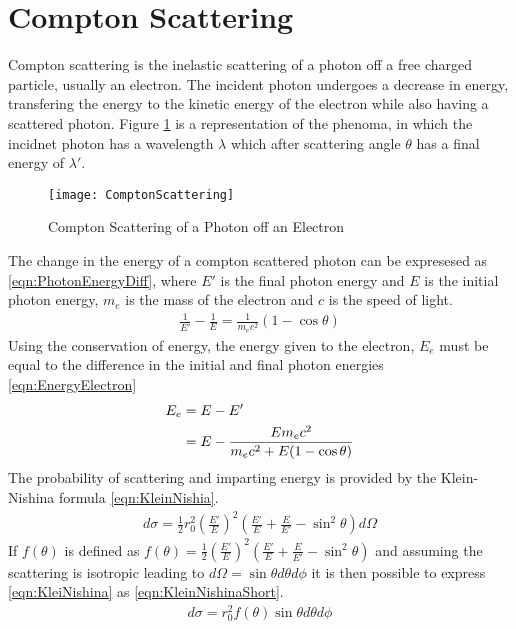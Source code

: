 \section{Compton Scattering}
Compton scattering is the inelastic scattering of a photon off a free charged particle, usually an electron.
The incident photon undergoes a decrease in energy, transfering the energy to the kinetic energy of the electron while also having a scattered photon.
Figure \ref{fig:ComptonScattering} is a representation of the phenoma, in which the incidnet photon has a wavelength $\lambda$ which after scattering angle $\theta$ has a final energy of $\lambda'$.
\begin{figure}
  \centering
  \texttt{[image: ComptonScattering]}
  \caption{Compton Scattering of a Photon off an Electron}
  \label{fig:ComptonScattering}
\end{figure}
The change in the energy of a compton scattered photon can be expresesed as \eqref{eqn:PhotonEnergyDiff}, where $E'$ is the final photon energy and $E$ is the initial photon energy, $m_e$ is the mass of the electron and $c$ is the speed of light.
\begin{align}
  \label{eqn:FinalPhotonEnergy}
  \frac{1}{E'} -\frac{1}{E} = \frac{1}{m_e c^2}\left(1-\cos\theta\right) 
\end{align}
Using the conservation of energy, the energy given to the electron, $E_e$ must be equal to the difference in the initial and final photon energies \eqref{eqn:EnergyElectron}
\begin{align}
  \label{eqn:EnergyElectron}
  E_e &= E - E' \\ \notag
   &= E - \frac{E m_e c^2}{m_e c^2 + E (1-\cos\theta)}
\end{align}
The probability of scattering and imparting energy is provided by the Klein-Nishina formula \eqref{eqn:KleinNishia}.
\begin{align}
  \label{eqn:KleinNishina}
  d\sigma = \frac{1}{2} r_0^2 \left(\frac{E'}{E}\right)^2 \left(\frac{E'}{E} + \frac{E}{E'}-\sin^2\theta\right)d\Omega
\end{align}
If $f(\theta)$ is defined as $f(\theta) = \frac{1}{2}\left(\frac{E'}{E}\right)^2 \left(\frac{E'}{E} + \frac{E}{E'}-\sin^2\theta\right)$ and assuming the scattering is isotropic leading to $d\Omega = \sin\theta d\theta d\phi$ it is then possible to express \eqref{eqn:KleiNishina} as \eqref{eqn:KleinNishinaShort}.
\begin{align}
  \label{eqn:KleinNishinaShort}
    d\sigma = r_0^2 f(\theta)\sin\theta d\theta d\phi
\end{align}
